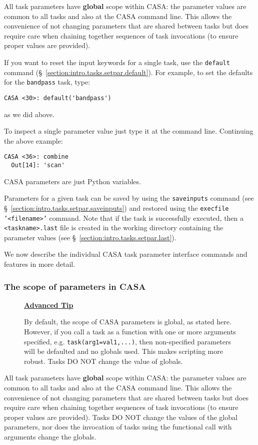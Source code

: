 All task parameters have {\bf global} scope within CASA: the
parameter values are common to all tasks and also at the CASA command
line. This allows the convenience of not changing parameters that are
shared between tasks but does require care when chaining together
sequences of task invocations (to ensure proper values are provided).

If you want to reset the input keywords for a single task, use the
{\tt default} command (\S~\ref{section:intro.tasks.setpar.default}).  
For example, to set the defaults for the {\tt bandpass} task, type:
\small
\begin{verbatim}
CASA <30>: default('bandpass')
\end{verbatim}
\normalsize
as we did above.

To inspect a single parameter value just type it at the command line.
Continuing the above example:
\small
\begin{verbatim}
CASA <36>: combine
  Out[14]: 'scan'
\end{verbatim}
\normalsize
CASA parameters are just Python variables.

Parameters for a given task can be saved by using the {\tt saveinputs}
command (see \S~\ref{section:intro.tasks.setpar.saveinputs})
and restored using the {\tt execfile '<filename>'} command.  Note that
if the task is successfully executed, then a {\tt <taskname>.last}
file is created in the working directory containing the parameter
values (see \S~\ref{section:intro.tasks.setpar.last}).

We now describe the individual CASA task parameter interface commands
and features in more detail.

\subsubsection{The scope of parameters in CASA}
\label{section:intro.tasks.setpar.scope}

\begin{wrapfigure}{r}{2.5in}
  \begin{boxedminipage}{2.5in}
     \centerline{\underline{\bf Advanced Tip}}
     By default, the scope of CASA parameters is global, as stated
     here.  However, if you call a task as a function with one or
     more arguments specified, e.g. {\tt task(arg1=val1,...)}, then
     non-specified parameters will be defaulted and no globals used.
     This makes scripting more robust.  Tasks DO NOT change the value
     of globals.
  \end{boxedminipage}
\end{wrapfigure}
All task parameters have {\bf global} scope within CASA: the
parameter values are common to all tasks and also at the CASA command
line. This allows the convenience of not changing parameters that are
shared between tasks but does require care when chaining together
sequences of task invocations (to ensure proper values are provided).
Tasks DO NOT change the values of the global parameters, nor does the
invocation of tasks using the functional call with arguments change
the globals.


